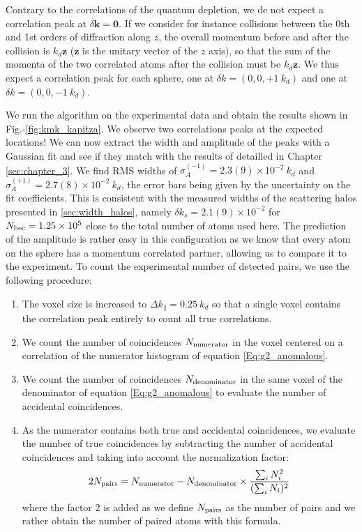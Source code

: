 Contrary to the \kmk correlations of the quantum depletion, we de not expect a correlation peak at $\delta \bm{k}=\bm{0}$. If we consider for instance collisions between the 0th and 1st orders of diffraction along $z$, the overall momentum before and after the collision is $k_d \bm{z}$ ($\bm{z}$ is the unitary vector of the $z$ axis), so that the sum of the momenta of the two correlated atoms after the collision must be $k_d \bm{z}$. We thus expect a correlation peak for each sphere, one at $\delta k = (0,0,+1 \ k_d)$  and one at $\delta k = (0,0,-1 \ k_d)$.

We run the algorithm on the experimental data and obtain the results shown in Fig.-\ref{fig:kmk_kapitza}. We observe two correlations peaks at the expected locations! We can now extract the width and amplitude of the peaks with a Gaussian fit and see if they match with the results of \cite{tenart2020two} detailled in Chapter \ref{sec:chapter_3}. We find RMS widths of $\sigma_A^{(-1)}=2.3(9) \times 10^{-2} \ k_d$ and $\sigma_A^{(+1)}=2.7(8) \times 10^{-2} \ k_d$, the error bars being given by the uncertainty on the fit coefficients. This is consistent with the measured widths of the scattering halos presented in \ref{sec:width_halos}, namely $\delta k_s = 2.1(9) \times 10^{-2}$ for $N_{\rm{bec}}=1.25 \times 10^5$ close to the total number of atoms used here. 
The prediction of the amplitude is rather easy in this configuration as we know that every atom on the sphere has a momentum correlated partner, allowing us to compare it to the experiment. To count the experimental number of detected pairs, we use the following procedure:


\begin{enumerate}
    \item The voxel size is increased to $\Delta k_{\parallel} = 0.25 \ k_d$ so that a single voxel contains the correlation peak entirely to count all true correlations.
    
    \item We count the number of coincidences $N_{\rm{numerator}}$ in the voxel centered on a correlation of the numerator histogram of equation \ref{Eq:g2_anomalous}. 
 
   
    \item  We count the number of coincidences $N_{\rm{denominator}}$ in the same voxel of the denominator of equation \ref{Eq:g2_anomalous} to evaluate the number of accidental coincidences. 
    
    
    \item As the numerator contains both true and accidental coincidences, we evaluate the number of true coincidences by subtracting the number of accidental coincidences and taking into account the normalization factor:
    \begin{equation}
          2N_{\rm{pairs}}=N_{\rm{numerator}} - N_{\rm{denominator}} \times \frac{\sum_i N_i^2}{(\sum_i N_i)^2}
    \end{equation}
    where the factor 2 is added as we define $N_{\rm{pairs}}$ as the number of pairs and we rather obtain the number of paired atoms with this formula.
  
\end{enumerate}

